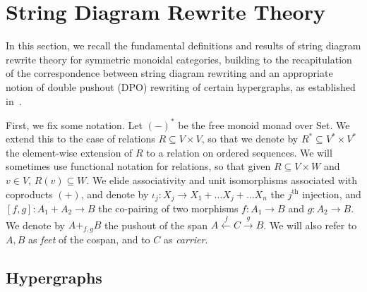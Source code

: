 \section{String Diagram Rewrite Theory}\label{sec:combinatorial-semantics}

In this section,  we recall the fundamental definitions and results of string diagram rewrite theory for symmetric monoidal categories,  building to the recapitulation of the correspondence between string diagram rewriting and an appropriate notion of double pushout (DPO) rewriting of certain hypergraphs,  as established in~\cite{bonchi_string_2022-1, bonchi_string_2022-2}.  

First,  we fix some notation.  Let $(-)^*$ be the free monoid monad over \textsf{Set}.  
We extend this to the case of relations $R \subseteq V \times V$,  so that we denote by $R^{*} \subseteq V^* \times V^*$ the element-wise extension of $R$ to a relation on ordered sequences. 
We will sometimes use functional notation for relations,  so that given $R \subseteq V \times W$ and $v \in V$,  $R(v) \subseteq W$. 
We elide associativity and unit isomorphisms associated with coproducts $(+)$,  and denote by $\iota_j: X_{j} \rightarrow X_{1} + \ldots X_{j} + \ldots X_{n}$ the $j^{\text{th}}$ injection,  and $[f,g]: A_1 + A_2 \to B$ the co-pairing of two morphisms $f: A_1 \to B$ and $g:A_2 \to B$. 
We denote by $A +_{f,g} B$ the pushout of the span $A \xleftarrow{f} C \xrightarrow{g} B$.
We will also refer to $A,B$ as \textit{feet} of the cospan, and to $C$ as \textit{carrier}.

\subsection{Hypergraphs}


